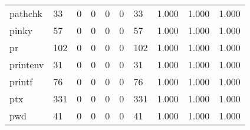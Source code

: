 \begin{longtable}{lp{1.3cm}p{1.3cm}p{1.3cm}p{1.3cm}p{1.3cm}p{1.3cm}p{1.3cm}p{1.3cm}p{1.3cm}}
pathchk   &                     33 &                                             0 &                                            0 &                                           0 &                                            0 &                                         33 &                                1.000 &                                  1.000 &                                1.000 \\
pinky     &                     57 &                                             0 &                                            0 &                                           0 &                                            0 &                                         57 &                                1.000 &                                  1.000 &                                1.000 \\
pr        &                    102 &                                             0 &                                            0 &                                           0 &                                            0 &                                        102 &                                1.000 &                                  1.000 &                                1.000 \\
printenv  &                     31 &                                             0 &                                            0 &                                           0 &                                            0 &                                         31 &                                1.000 &                                  1.000 &                                1.000 \\
printf    &                     76 &                                             0 &                                            0 &                                           0 &                                            0 &                                         76 &                                1.000 &                                  1.000 &                                1.000 \\
ptx       &                    331 &                                             0 &                                            0 &                                           0 &                                            0 &                                        331 &                                1.000 &                                  1.000 &                                1.000 \\
pwd       &                     41 &                                             0 &                                            0 &                                           0 &                                            0 &                                         41 &                                1.000 &                                  1.000 &                                1.000 \\

\end{longtable}
